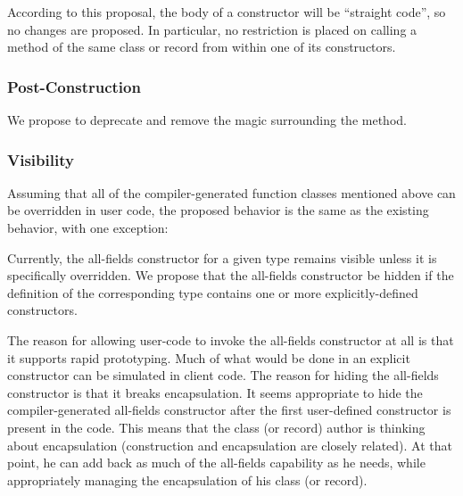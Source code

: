 According to this proposal, the body of a constructor will be ``straight code'', so no
changes are proposed.  In particular, no restriction is placed on calling a method of the
same class or record from within one of its constructors.

\subsubsection{Post-Construction}

We propose to deprecate and remove the magic surrounding the  method.

\subsubsection{Visibility}

Assuming that all of the compiler-generated function classes mentioned above can be
overridden in user code, the proposed behavior is the same as the existing behavior, with
one exception:

Currently, the all-fields constructor for a given type remains visible unless it
is specifically overridden.  We propose that the all-fields constructor be
hidden if the definition of the corresponding type contains one or more
explicitly-defined constructors.

The reason for allowing user-code to invoke the all-fields constructor at all is that it
supports rapid prototyping.  Much of what would be done in an explicit constructor can be
simulated in client code.  The reason for hiding the all-fields constructor is that it
breaks encapsulation.  It seems appropriate to hide the compiler-generated all-fields
constructor after the first user-defined constructor is present in the code.  This means
that the class (or record) author is thinking about encapsulation (construction and
encapsulation are closely related).  At that point, he can add back as much of the
all-fields capability as he needs, while appropriately managing the encapsulation of his class (or
record).

